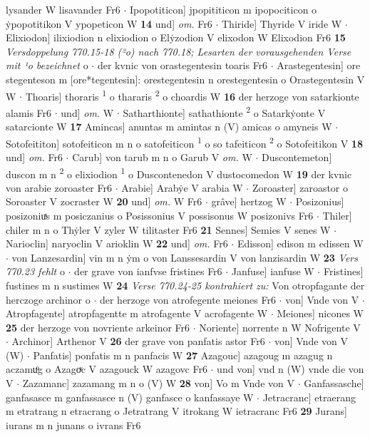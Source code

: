 \documentclass[8pt,a4paper,notitlepage]{article}
\begin{document}
\begin{table}[ht]
\begin{minipage}[t]{0.5\linewidth}
lysander W lisavander Fr6  $\cdot$ Ipopotiticon] jpopititicon m ipopociticon o ẏpopotitikon V ypopeticon W \textbf{14} und] \textit{om.} Fr6  $\cdot$ Thiride] Thyride V iride W  $\cdot$ Elixiodon] ilixiodion n elixiodion o Elẏzodion V elixodon W Elixodion Fr6 \textbf{15} \textit{Versdoppelung 770.15-18 (²o) nach 770.18; Lesarten der vorausgehenden Verse mit ¹o bezeichnet} o   $\cdot$ der kvnic von orastegentesin toaris Fr6  $\cdot$ Arastegentesin] ore stegenteson m [ore*tegentesin]: orestegentesin n orestegentesin o Orastegentesin V W  $\cdot$ Thoaris] thoraris \textsuperscript{1}\hspace{-1.3mm} o thararis \textsuperscript{2}\hspace{-1.3mm} o choardis W \textbf{16} der herzoge von satarkionte alamis Fr6  $\cdot$ und] \textit{om.} W  $\cdot$ Satharthionte] sathathionte \textsuperscript{2}\hspace{-1.3mm} o Satarkẏonte V satarcionte W \textbf{17} Amincas] anuntas m amintas n (V) amicas o amyneis W  $\cdot$ Sotofeititon] sotofeiticon m n o satofeiticon \textsuperscript{1}\hspace{-1.3mm} o so tafeiticon \textsuperscript{2}\hspace{-1.3mm} o Sotofeitikon V \textbf{18} und] \textit{om.} Fr6  $\cdot$ Carub] von tarub m n o Garub V \textit{om.} W  $\cdot$ Duscontemeton] duscon m n \textsuperscript{2}\hspace{-1.3mm} o elixiodion \textsuperscript{1}\hspace{-1.3mm} o Duscontenedon V dustocomedon W \textbf{19} der kvnic von arabie zoroaster Fr6  $\cdot$ Arabie] Arabẏe V arabia W  $\cdot$ Zoroaster] zaroastor o Soroaster V zocraster W \textbf{20} und] \textit{om.} W Fr6  $\cdot$ grâve] hertzog W  $\cdot$ Posizonius] posizoniuͯs m posiczanius o Posissonius V possisonus W posizonivs Fr6  $\cdot$ Thiler] chiler m n o Thẏler V zyler W tilitaster Fr6 \textbf{21} Sennes] Semies V senes W  $\cdot$ Narioclin] naryoclin V arioklin W \textbf{22} und] \textit{om.} Fr6  $\cdot$ Edisson] edison m edissen W  $\cdot$ von Lanzesardin] vin m n ẏm o von Lanssesardin V von lanzisardin W \textbf{23} \textit{Vers 770.23 fehlt} o   $\cdot$ der grave von ianfvse fristines Fr6  $\cdot$ Janfuse] ianfuse W  $\cdot$ Fristines] fustines m n sustimes W \textbf{24} \textit{Verse 770.24-25 kontrahiert zu:} Von otropfagante der herczoge archinor o   $\cdot$ der herzoge von atrofegente meiones Fr6  $\cdot$ von] Vnde von V  $\cdot$ Atropfagente] atropfagentte m atrofagente V acrofagente W  $\cdot$ Meiones] nicones W \textbf{25} der herzoge von novriente arkeinor Fr6  $\cdot$ Noriente] norrente n W Nofrigente V  $\cdot$ Archinor] Arthenor V \textbf{26} der grave von panfatis astor Fr6  $\cdot$ von] Vnde von V (W)  $\cdot$ Panfatis] ponfatis m n panfacis W \textbf{27} Azagouc] azagoug m azagug n aczamuͦg o Azagoͮc V azagouck W azagovc Fr6  $\cdot$ und von] vnd n (W) vnde die von V  $\cdot$ Zazamanc] zazamang m n o (V) W \textbf{28} von] Vo m Vnde von V  $\cdot$ Ganfassasche] ganfasasce m ganfassasce n (V) ganfasce o kanfassaye W  $\cdot$ Jetracranc] etraerang m etratrang n etracrang o Jetratrang V itrokang W ietracranc Fr6 \textbf{29} Jurans] iurans m n junans o ivrans Fr6  
\end{minipage}
\end{table}
\end{document}
